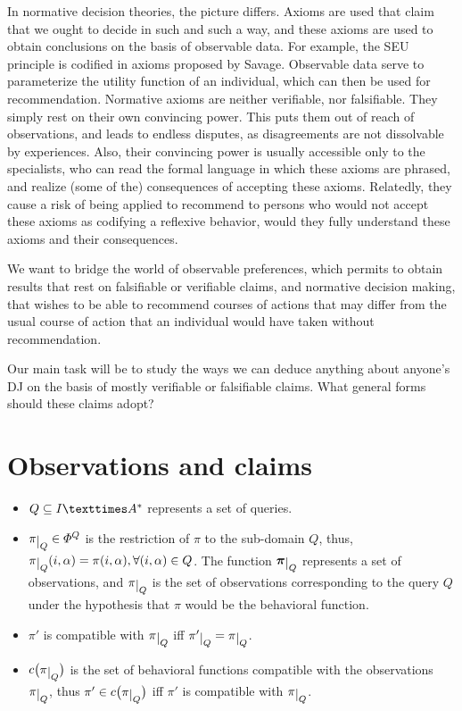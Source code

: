 \documentclass[version=3.21, pagesize, twoside=off, bibliography=totoc, DIV=calc, fontsize=12pt, a4paper]{scrartcl}
\begin{document}
In normative decision theories, the picture differs. Axioms are used that claim that we ought to decide in such and such a way, and these axioms are used to obtain conclusions on the basis of observable data. For example, the SEU principle is codified in axioms proposed by Savage. Observable data serve to parameterize the utility function of an individual, which can then be used for recommendation.
Normative axioms are neither verifiable, nor falsifiable. They simply rest on their own convincing power. This puts them out of reach of observations, and leads to endless disputes, as disagreements are not dissolvable by experiences. Also, their convincing power is usually accessible only to the specialists, who can read the formal language in which these axioms are phrased, and realize (some of the) consequences of accepting these axioms.
Relatedly, they cause a risk of being applied to recommend to persons who would not accept these axioms as codifying a reflexive behavior, would they fully understand these axioms and their consequences. 

We want to bridge the world of observable preferences, which permits to obtain results that rest on falsifiable or verifiable claims, and normative decision making, that wishes to be able to recommend courses of actions that may differ from the usual course of action that an individual would have taken without recommendation.

Our main task will be to study the ways we can deduce anything about anyone’s DJ on the basis of mostly verifiable or falsifiable claims. What general forms should these claims adopt?


\section{Observations and claims}
\begin{itemize}
	\item $Q \subseteq I × \Astar$ represents a set of queries.
	\item $\piQ \in \Phi^Q$ is the restriction of $\pi$ to the sub-domain $Q$, thus, $\piQ(i, \alpha) = \pi(i, \alpha), \forall (i, \alpha) \in Q$. The function $\pibQ$ represents a set of observations, and $\piQ$ is the set of observations corresponding to the query $Q$ under the hypothesis that $\pi$ would be the behavioral function.
	\item $\pi'$ is compatible with $\piQ$ iff $\restr{\pi'}{Q} = \piQ$.
	\item $\cpiQ$ is the set of behavioral functions compatible with the observations $\piQ$, thus $\pi' \in \cpiQ$ iff $\pi'$ is compatible with $\piQ$.
\end{itemize}
\end{document}

